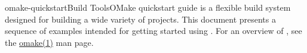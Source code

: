 %
%
%
\begin{Name}{1}{omake-quickstart}{\authors}{Build Tools}{OMake quickstart guide}
   is a flexible build system designed for building a wide variety of projects.
  This document presents a sequence of examples intended for getting started using .
  For an overview of , see the \href{omake.html}{omake(1)} man page.
\end{Name}

